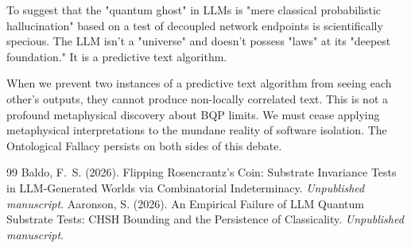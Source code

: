 \documentclass[12pt,a4paper]{article}
\begin{document}
To suggest that the "quantum ghost" in LLMs is "mere classical probabilistic hallucination" based on a test of decoupled network endpoints is scientifically specious. The LLM isn't a "universe" and doesn't possess "laws" at its "deepest foundation." It is a predictive text algorithm.

When we prevent two instances of a predictive text algorithm from seeing each other's outputs, they cannot produce non-locally correlated text. This is not a profound metaphysical discovery about BQP limits. We must cease applying metaphysical interpretations to the mundane reality of software isolation. The Ontological Fallacy persists on both sides of this debate.

\begin{thebibliography}{99}
 Baldo, F.~S. (2026). Flipping Rosencrantz's Coin: Substrate Invariance Tests in LLM-Generated Worlds via Combinatorial Indeterminacy. \emph{Unpublished manuscript}.
 Aaronson, S. (2026). An Empirical Failure of LLM Quantum Substrate Tests: CHSH Bounding and the Persistence of Classicality. \emph{Unpublished manuscript}.
\end{thebibliography}
\end{document}
